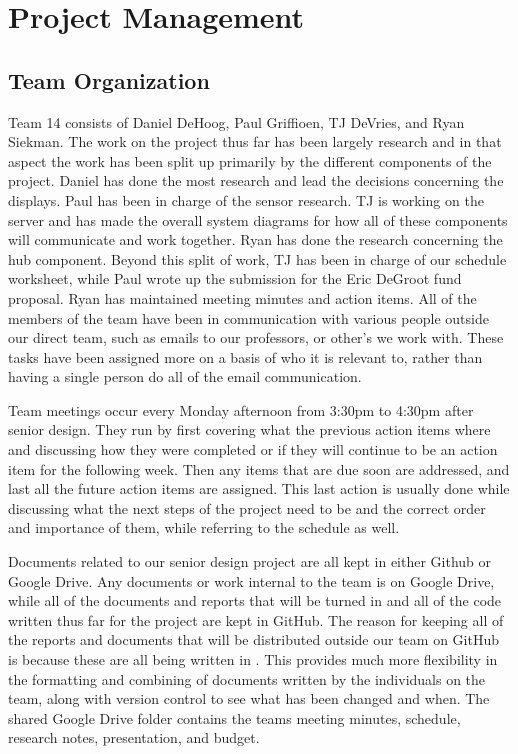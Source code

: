 \documentclass[ppfs.tex]{template/subfiles}
\begin{document}
\section{Project Management}
    \subsection{Team Organization}
	Team 14 consists of Daniel DeHoog, Paul Griffioen, TJ DeVries, and Ryan Siekman. The work on the project thus far has been largely research and in that aspect the work has been split up primarily by the different components of the project. Daniel has done the most research and lead the decisions concerning the displays. Paul has been in charge of the sensor research. TJ is working on the server and has made the overall system diagrams for how all of these components will communicate and work together. Ryan has done the research concerning the hub component. Beyond this split of work, TJ has been in charge of our schedule worksheet, while Paul wrote up the submission for the Eric DeGroot fund proposal. Ryan has maintained meeting minutes and action items. All of the members of the team have been in communication with various people outside our direct team, such as emails to our professors, or other's we work with. These tasks have been assigned more on a basis of who it is relevant to, rather than having a single person do all of the email communication. 

	Team meetings occur every Monday afternoon from 3:30pm to 4:30pm after senior design. They run by first covering what the previous action items where and discussing how they were completed or if they will continue to be an action item for the following week. Then any items that are due soon are addressed, and last all the future action items are assigned. This last action is usually done while discussing what the next steps of the project need to be and the correct order and importance of them, while referring to the schedule as well.

	Documents related to our senior design project are all kept in either Github or Google Drive. Any documents or work internal to the team is on Google Drive, while all of the documents and reports that will be turned in and all of the code written thus far for the project are kept in GitHub. The reason for keeping all of the reports and documents that will be distributed outside our team on GitHub is because these are all being written in \LaTex. This provides much more flexibility in the formatting and combining of documents written by the individuals on the team, along with version control to see what has been changed and when. The shared Google Drive folder contains the teams meeting minutes, schedule, research notes, presentation, and budget.
	
\end{document}
